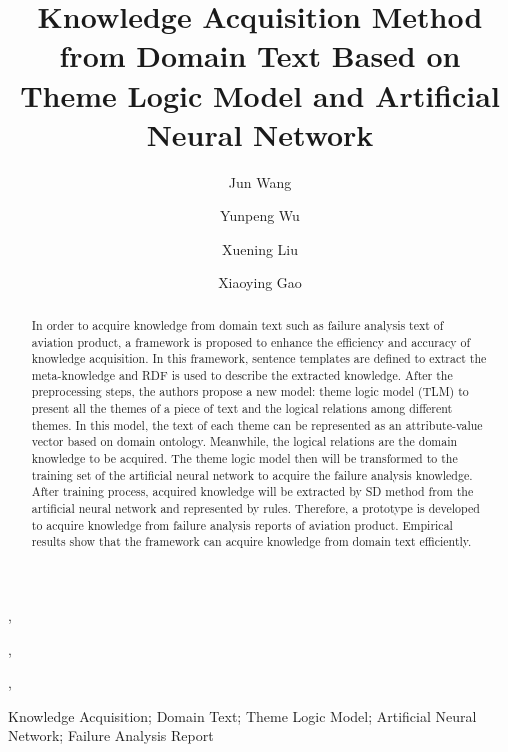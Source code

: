 \documentclass{elsart}
\begin{document}
\begin{frontmatter}


\title{Knowledge Acquisition Method from Domain Text Based on Theme Logic Model and Artificial Neural Network}


\author[buaa]{Jun Wang},
\author[buaa]{Yunpeng Wu},
\author[buaa]{Xuening Liu},
\author[buaa]{Xiaoying Gao}

\address[buaa]{School of Economics \& Management, Beihang University, 
Beijing 100083, P.R. China }


\begin{abstract}
In order to acquire knowledge from domain text such as failure
analysis text of aviation product, a framework is proposed to enhance
the efficiency and accuracy of knowledge acquisition. In this
framework, sentence templates are defined to extract the
meta-knowledge and RDF is used to describe the extracted knowledge.
After the preprocessing steps, the authors propose a new model: theme logic
model (TLM) to present all the themes of a piece of text and the logical
relations among different themes. In this model, the text of each
theme can be represented as an attribute-value vector based on domain
ontology. Meanwhile, the logical relations are the domain knowledge to be
acquired. The theme logic model then will be transformed to the
training set of the artificial neural network to acquire the failure
analysis knowledge. After training process, acquired knowledge will be extracted by SD method from the artificial neural network and represented by rules. Therefore, a prototype is developed to acquire knowledge from failure analysis reports of aviation product. Empirical results show that the framework can acquire knowledge from domain text efficiently.
\end{abstract}

\begin{keyword}


Knowledge Acquisition; Domain Text; Theme Logic Model; Artificial Neural Network; Failure Analysis Report


\end{keyword}

\end{frontmatter}
\end{document}

